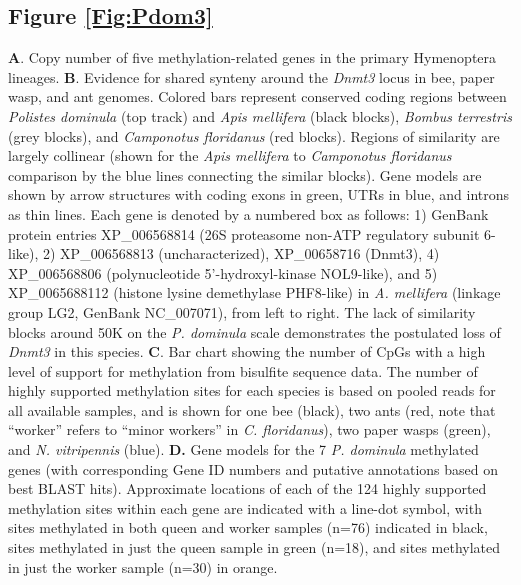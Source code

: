 \subsection*{Figure \ref{Fig:Pdom3}}
\noindent
\textbf{A}. Copy number of five methylation-related genes in the primary Hymenoptera lineages.
\textbf{B}. Evidence for shared synteny around the \textit{Dnmt3} locus in bee, paper wasp, and ant genomes. Colored bars represent conserved coding regions between \textit{Polistes dominula} (top track) and \textit{Apis mellifera} (black blocks), \textit{Bombus terrestris} (grey blocks), and \textit{Camponotus floridanus} (red blocks). Regions of similarity are largely collinear (shown for the \textit{Apis mellifera} to \textit{Camponotus floridanus} comparison by the blue lines connecting the similar blocks). Gene models are shown by arrow structures with coding exons in green, UTRs in blue, and introns as thin lines. Each gene is denoted by a numbered box as follows: 1) GenBank protein entries XP\_006568814 (26S proteasome non-ATP regulatory subunit 6-like), 2) XP\_006568813 (uncharacterized), XP\_00658716 (Dnmt3), 4) XP\_006568806 (polynucleotide 5'-hydroxyl-kinase NOL9-like), and 5) XP\_0065688112 (histone lysine demethylase PHF8-like) in \textit{A. mellifera} (linkage group LG2, GenBank NC\_007071), from left to right. The lack of similarity blocks around 50K on the \textit{P. dominula} scale demonstrates the postulated loss of \textit{Dnmt3} in this species.
\textbf{C}. Bar chart showing the number of CpGs with a high level of support for methylation from bisulfite sequence data. The number of highly supported methylation sites for each species is based on pooled reads for all available samples, and is shown for one bee (black), two ants (red, note that ``worker'' refers to ``minor workers'' in \textit{C. floridanus}), two paper wasps (green), and \textit{N. vitripennis} (blue).
\textbf{D.} Gene models for the 7 \textit{P. dominula} methylated genes (with corresponding Gene ID numbers and putative annotations based on best BLAST hits). Approximate locations of each of the 124 highly supported methylation sites within each gene are indicated with a line-dot symbol, with sites methylated in both queen and worker samples (n=76) indicated in black, sites methylated in just the queen sample in green (n=18), and sites methylated in just the worker sample (n=30) in orange.

